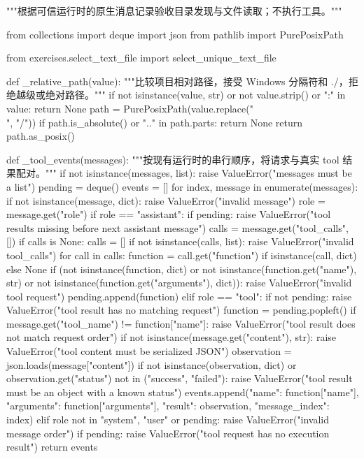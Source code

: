 \begin{Code}
"""根据可信运行时的原生消息记录验收目录发现与文件读取；不执行工具。"""

from collections import deque
import json
from pathlib import PurePosixPath

from exercises.select_text_file import select_unique_text_file


def _relative_path(value):
    """比较项目相对路径，接受 Windows 分隔符和 ./，拒绝越级或绝对路径。"""
    if not isinstance(value, str) or not value.strip() or ":" in value:
        return None
    path = PurePosixPath(value.replace("\\", "/"))
    if path.is_absolute() or ".." in path.parts:
        return None
    return path.as_posix()


def _tool_events(messages):
    """按现有运行时的串行顺序，将请求与真实 tool 结果配对。"""
    if not isinstance(messages, list):
        raise ValueError("messages must be a list")
    pending = deque()
    events = []
    for index, message in enumerate(messages):
        if not isinstance(message, dict):
            raise ValueError("invalid message")
        role = message.get("role")
        if role == "assistant":
            if pending:
                raise ValueError("tool results missing before next assistant message")
            calls = message.get("tool_calls", [])
            if calls is None:
                calls = []
            if not isinstance(calls, list):
                raise ValueError("invalid tool_calls")
            for call in calls:
                function = call.get("function") if isinstance(call, dict) else None
                if (not isinstance(function, dict)
                        or not isinstance(function.get("name"), str)
                        or not isinstance(function.get("arguments"), dict)):
                    raise ValueError("invalid tool request")
                pending.append(function)
        elif role == "tool":
            if not pending:
                raise ValueError("tool result has no matching request")
            function = pending.popleft()
            if message.get("tool_name") != function["name"]:
                raise ValueError("tool result does not match request order")
            if not isinstance(message.get("content"), str):
                raise ValueError("tool content must be serialized JSON")
            observation = json.loads(message["content"])
            if not isinstance(observation, dict) or observation.get("status") not in ("success", "failed"):
                raise ValueError("tool result must be an object with a known status")
            events.append({"name": function["name"], "arguments": function["arguments"],
                           "result": observation, "message_index": index})
        elif role not in {"system", "user"} or pending:
            raise ValueError("invalid message order")
    if pending:
        raise ValueError("tool request has no execution result")
    return events



\end{Code}
